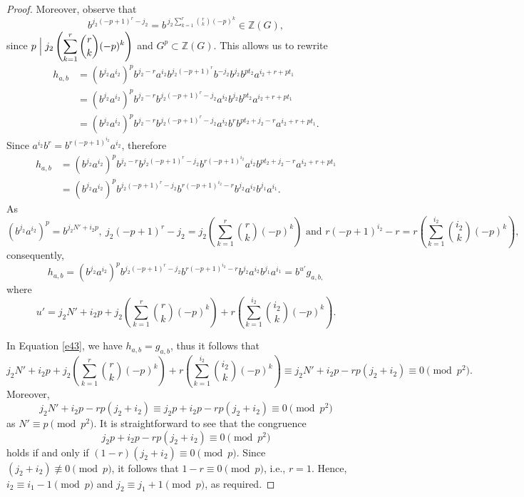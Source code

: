 \documentclass[11pt]{amsart}
\theoremstyle{plain}
\numberwithin{equation}{section}
\begin{document}
\begin{proof}
Moreover, observe that
\[
b^{j_2(-p+1)^r - j_2} = b^{\, j_2 \displaystyle\sum_{k=1}^{r}\binom{r}{k}(-p)^k} \in \mathbb{Z}(G),
\]
since $ p \Bigm| j_2 \left(\displaystyle\sum_{k=1}^{r}\binom{r}{k}(-p)^k\right)$ and $ G^{p} \subset \mathbb{Z}(G)$.
This allows us to rewrite
\[
\begin{aligned}
h_{a,b}
&= (b^{j_2}a^{i_2})^{p} b^{j_2-r} a^{i_2} b^{j_2(-p+1)^{r}} b^{-j_2}b^{j_2}b^{pt_2} a^{i_2+r+pt_1} \\
&= (b^{j_2}a^{i_2})^{p} b^{j_2-r} b^{j_2(-p+1)^r - j_2} a^{i_2} b^{j_2} b^{pt_2} a^{i_2+r+pt_1} \\
&= (b^{j_2}a^{i_2})^{p} b^{j_2-r} b^{j_2(-p+1)^r - j_2} a^{i_2} b^{r} b^{pt_2 + j_2 - r} a^{i_2+r+pt_1}.
\end{aligned}
\]
Since \( a^{i_2}b^{r} = b^{r(-p+1)^{i_2}}a^{i_2} \), therefore
\[
\begin{aligned}
h_{a,b}
&= (b^{j_2}a^{i_2})^{p} b^{j_2-r} b^{j_2(-p+1)^r - j_2} b^{r(-p+1)^{i_2}} a^{i_2} b^{pt_2 + j_2 - r} a^{i_2+r+pt_1} \\
&= (b^{j_2}a^{i_2})^{p} b^{j_2(-p+1)^r - j_2} b^{r(-p+1)^{i_2} - r} b^{j_2} a^{i_2} b^{j_1} a^{i_1}.
\end{aligned}
\]
As $$(b^{j_2}a^{i_2})^{p}=b^{j_2N'+i_2p},~ j_2(-p+1)^r-j_2 =j_2 \left(\sum_{k=1}^{r} \binom{r}{k}(-p)^k\right) \text{ and } r(-p+1)^{i_2}-r=r\left(\sum_{k=1}^{i_2}\binom{i_2}{k}(-p)^k\right),$$
consequently,
\[
h_{a,b}={(b^{j_2}a^{i_2})^{p}b^{j_2(-p+1)^r-j_2}b^{r(-p+1)^{i_2}-r}b^{j_2}a^{i_2}b^{j_1}a^{i_1}}=b^{u'}g_{a,b,}
\]
where 
\[
u'=j_2N'+i_2p+j_2\left(\displaystyle\sum_{k=1}^{r}\binom{r}{k}(-p)^k\right)+r\left(\displaystyle\sum_{k=1}^{i_2}\binom{i_2}{k}(-p)^k\right).
\]


In Equation \eqref{e43}, we have $h_{a,b}=g_{a,b}$, thus it follows that 
\[j_2N'+i_2p+j_2 \left(\sum_{k=1}^{r}\binom{r}{k}(-p)^k\right)+r\left(\sum_{k=1}^{i_2}\binom{i_2}{k}(-p)^k\right) \equiv j_2N'+i_2p-rp(j_2+i_2) \equiv 0 \pmod {p^2}.\] 
Moreover, $$j_2N'+i_2p-rp(j_2+i_2) \equiv j_2p+i_2p-rp(j_2+i_2) \equiv 0 \pmod {p^2}$$ 
as $N' \equiv p \pmod {p^2}.$
It is straightforward to see that the congruence
\[
j_2p + i_2p - rp(j_2 + i_2) \equiv 0 \pmod{p^2}
\]
holds if and only if
$
(1 - r)(j_2 + i_2) \equiv 0 \pmod{p}.
$
Since \( (j_2 + i_2) \not\equiv 0 \pmod{p} \), it follows that \( 1 - r \equiv 0 \pmod{p} \), i.e., \( r = 1 \).
Hence, \( i_2 \equiv i_1 - 1 \pmod{p} \) and \( j_2 \equiv j_1 + 1 \pmod{p} \), as required.
 


\end{proof}
\end{document}
